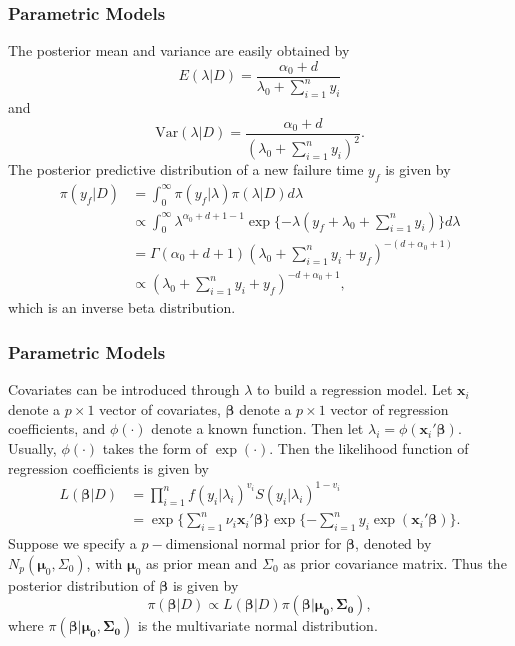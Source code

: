 \documentclass{beamer}
\begin{document}
	\begin{frame}
		\frametitle{Parametric Models}
		The posterior mean and variance are easily obtained by
		\[
		E(\lambda | D) = \frac{\alpha_0 + d}{\lambda_0 + \sum_{i = 1}^{n}y_i}
		\]
		and 
		\[
		\text{Var}(\lambda | D) = \frac{\alpha_0 + d}{(\lambda_0 + \sum_{i = 1}^{n}y_i) ^ 2}.
		\]
		The posterior predictive distribution of a new failure time $y_f$ is given by
		\begin{align*}
			\pi(y_f | D) & = \int_{0}^{\infty}\pi(y_f | \lambda) \pi(\lambda | D) d\lambda \\
			& \propto\int_{0}^{\infty} \lambda ^ {\alpha_0 + d + 1 - 1}\exp\{-\lambda(y_f + \lambda_0 + \sum_{i = 1}^{n}y_i)\}d\lambda \\
			& = \Gamma(\alpha_0 + d + 1)(\lambda_0 + \sum_{i = 1}^{n}y_i + y_f) ^ { -(d + \alpha_0 + 1)} \\
			& \propto (\lambda_0 + \sum_{i = 1}^{n}y_i + y_f) ^ {-d + \alpha_0 + 1},
		\end{align*}
		which is an inverse beta distribution.
	\end{frame}
	
	\begin{frame}
		\frametitle{Parametric Models}
		Covariates can be introduced through $\lambda$ to build a regression model. Let $\boldsymbol{x}_i$ denote a $p\times1$ vector of covariates, $\boldsymbol{\beta}$ denote a $p\times1$ vector of regression coefficients, and $\phi(\cdot)$ denote a known function. Then let $\lambda_i = \phi( \boldsymbol{x}_i'\boldsymbol{\beta})$. Usually, $\phi(\cdot)$ takes the form of $\exp(\cdot)$. Then the likelihood function of regression coefficients is given by 
		\begin{align*}
			L(\boldsymbol{\beta} | D) & = \prod_{i = 1}^{n}f(y_i | \lambda_i) ^ {v_i}S(y_i | \lambda_i) ^ {1 - v_i} \\
			& = \exp\{\sum_{i = 1}^{n}\nu_i\boldsymbol{x}_i'\boldsymbol{\beta}\}\exp\{-\sum_{i = 1}^{n}y_i\exp(\boldsymbol{x}_i'\boldsymbol{\beta})\}.
		\end{align*}
		Suppose we specify a $p-$dimensional normal prior for $\boldsymbol{\beta}$, denoted by $N_p(\boldsymbol{\mu}_0, \Sigma_0)$, with 
		$\boldsymbol{\mu}_0$ as prior mean and $\Sigma_0$ as prior covariance matrix. Thus the posterior distribution of $\boldsymbol{\beta}$ is given by 
		\[
		\pi(\boldsymbol{\beta} | D) \propto L(\boldsymbol{\beta} | D)\pi(\boldsymbol{\beta} | \boldsymbol{\mu_0, \Sigma_0}),
		\]
		where $\pi(\boldsymbol{\beta} | \boldsymbol{\mu_0, \Sigma_0})$ is the multivariate normal distribution.
	\end{frame}
	
\end{document}
